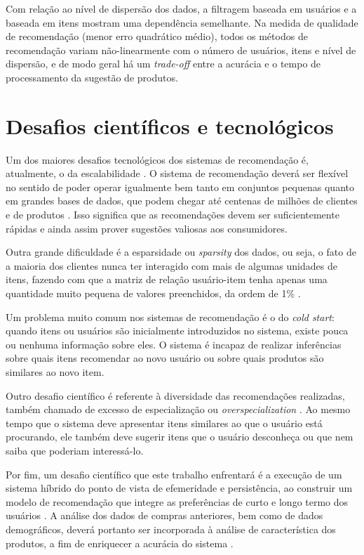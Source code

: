Com relação ao nível de dispersão dos dados, a filtragem baseada em usuários e a baseada em itens mostram uma dependência semelhante. Na medida de qualidade de recomendação (menor erro quadrático médio), todos os métodos de recomendação variam não-linearmente com o número de usuários, itens e nível de dispersão, e de modo geral há um \textit{trade-off} entre a acurácia e o tempo de processamento da sugestão de produtos. 

\section{Desafios científicos e tecnológicos} %
\label{sec:desafios_cient_ficos_e_tecnol_gicos}

Um dos maiores desafios tecnológicos dos sistemas de recomendação é, atualmente, o da escalabilidade \cite{wei2007survey}. O sistema de recomendação deverá ser flexível no sentido de poder operar igualmente bem tanto em conjuntos pequenas quanto em grandes bases de dados, que podem chegar até centenas de milhões de clientes \cite{amazoncustomers} e de produtos \cite{amazonproducts}. Isso significa que as recomendações devem ser suficientemente rápidas e ainda assim prover sugestões valiosas aos consumidores.

Outra grande dificuldade é a esparsidade ou \textit{sparsity} dos dados, ou seja, o fato de a maioria dos clientes nunca ter interagido com mais de algumas unidades de itens, fazendo com que a matriz de relação usuário-item tenha apenas uma quantidade muito pequena de valores preenchidos, da ordem de 1\% \cite{fennell2009collaborative}.

Um problema muito comum nos sistemas de recomendação é o do \textit{cold start}: quando itens ou usuários são inicialmente introduzidos no sistema, existe pouca ou nenhuma informação sobre eles. O sistema é incapaz de realizar inferências sobre quais itens recomendar ao novo usuário ou sobre quais produtos são similares ao novo item. 

Outro desafio científico é referente à diversidade das recomendações realizadas, também chamado de excesso de especialização ou \textit{overspecialization} \cite{adomavicius2005toward}. Ao mesmo tempo que o sistema deve apresentar itens similares ao que o usuário está procurando, ele também deve sugerir itens que o usuário desconheça ou que nem saiba que poderiam interessá-lo. 

Por fim, um desafio científico que este trabalho enfrentará é a execução de um sistema híbrido do ponto de vista de efemeridade e persistência, ao construir um modelo de recomendação que integre as preferências de curto e longo termo dos usuários \cite{schafer1999recommender}. A análise dos dados de compras anteriores, bem como de dados demográficos, deverá portanto ser incorporada à análise de característica dos produtos, a fim de enriquecer a acurácia do sistema \cite{wei2007survey}.

